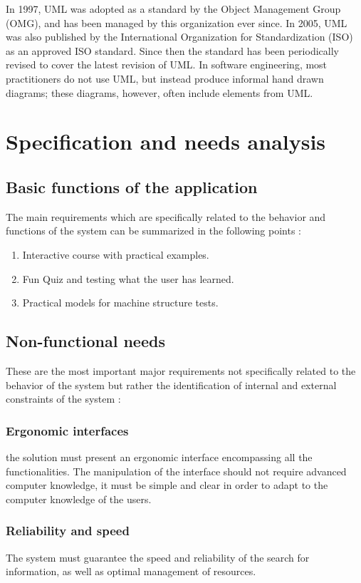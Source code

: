 In 1997, UML was adopted as a standard by the Object Management Group (OMG), and has been managed by this organization ever since. In 2005, UML was also published by the International Organization for Standardization (ISO) as an approved ISO standard. Since then the standard has been periodically revised to cover the latest revision of UML. In software engineering, most practitioners do not use UML, but instead produce informal hand drawn diagrams; these diagrams, however, often include elements from UML.\cite{YThi-UML}




\section{Specification and needs analysis}

\subsection{Basic functions of the application}
The main requirements which are specifically related to the behavior and functions of the system can be summarized in the following points :
\begin{enumerate}
	\item Interactive course with practical examples.
	\item Fun Quiz and testing what the user has learned.
	\item Practical models for machine structure tests.
\end{enumerate} 
\subsection{Non-functional needs}
These are the most important major requirements not specifically related to the behavior of the system but rather the identification of internal and external constraints of the system :
\subsubsection{Ergonomic interfaces}
the solution must present an ergonomic interface encompassing all the functionalities. The manipulation of the interface should not require advanced computer knowledge, it must be simple and clear in order to adapt to the computer knowledge of the users.
\subsubsection{Reliability and speed}
The system must guarantee the speed and reliability of the search for information, as well as optimal management of resources.
